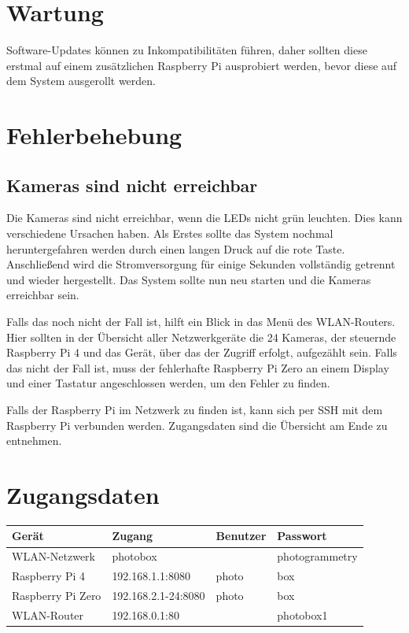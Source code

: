 \documentclass[./00PhotoBox.tex]{subfiles}
\begin{document}
\section{Wartung}
Software-Updates können zu Inkompatibilitäten führen, daher sollten diese erstmal auf einem zusätzlichen Raspberry Pi ausprobiert werden, bevor diese auf dem System ausgerollt werden.

\section{Fehlerbehebung}
\label{sec:Fehlerbehebung}
\subsection{Kameras sind nicht erreichbar}
Die Kameras sind nicht erreichbar, wenn die LEDs nicht grün leuchten. Dies kann verschiedene Ursachen haben. Als Erstes sollte das System nochmal heruntergefahren werden durch einen langen Druck auf die rote Taste. Anschließend wird die Stromversorgung für einige Sekunden vollständig getrennt und wieder hergestellt. Das System sollte nun neu starten und die Kameras erreichbar sein.

Falls das noch nicht der Fall ist, hilft ein Blick in das Menü des WLAN-Routers. Hier sollten in der Übersicht aller Netzwerkgeräte die 24 Kameras, der steuernde Raspberry Pi 4 und das Gerät, über das der Zugriff erfolgt, aufgezählt sein. Falls das nicht der Fall ist, muss der fehlerhafte Raspberry Pi Zero an einem Display und einer Tastatur angeschlossen werden, um den Fehler zu finden.

Falls der Raspberry Pi im Netzwerk zu finden ist, kann sich per SSH mit dem Raspberry Pi verbunden werden. Zugangsdaten sind die Übersicht am Ende zu entnehmen.

\section{Zugangsdaten}

\begin{tabular}{|l|l|l|l|}
    \hline
    \textbf{Gerät}    & \textbf{Zugang}     & \textbf{Benutzer} & \textbf{Passwort} \\
    \hline
    WLAN-Netzwerk     & photobox            &                   & photogrammetry    \\
    \hline
    Raspberry Pi 4    & 192.168.1.1:8080    & photo             & box               \\
    \hline
    Raspberry Pi Zero & 192.168.2.1-24:8080 & photo             & box               \\
    \hline
    WLAN-Router       & 192.168.0.1:80      &                   & photobox1         \\
    \hline
\end{tabular}

\end{document}
